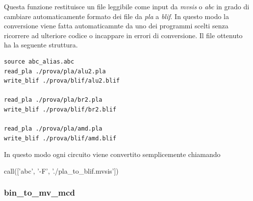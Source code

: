 \documentclass[]{book}
\newenvironment{Shaded}{\begin{snugshade}}{\end{snugshade}}
\newcommand{\NormalTok}[1]{#1}
\newcommand{\StringTok}[1]{\textcolor[rgb]{0.31,0.60,0.02}{#1}}
\begin{document}
Questa funzione restituisce un file leggibile come input da \emph{mvsis} o \emph{abc} in grado di cambiare automaticamente formato dei file da \emph{pla} a \emph{blif}. In questo modo la conversione viene fatta automaticamnte da uno dei programmi scelti senza ricorrere ad ulteriore codice o incappare in errori di conversione. Il file ottenuto ha la seguente struttura.

\begin{verbatim}
source abc_alias.abc
read_pla ./prova/pla/alu2.pla
write_blif ./prova/blif/alu2.blif

read_pla ./prova/pla/br2.pla
write_blif ./prova/blif/br2.blif

read_pla ./prova/pla/amd.pla
write_blif ./prova/blif/amd.blif
\end{verbatim}

In questo modo ogni circuito viene convertito semplicemente chiamando

\begin{Shaded}
\begin{Highlighting}[]
\NormalTok{call([}\StringTok{'abc'}\NormalTok{, }\StringTok{'-F'}\NormalTok{, }\StringTok{'./pla_to_blif.mvsis'}\NormalTok{])}
\end{Highlighting}
\end{Shaded}

\newpage

\hypertarget{bin_to_mv_mcd}{%
\subsubsection{bin\_to\_mv\_mcd}\label{bin_to_mv_mcd}}
\end{document}
